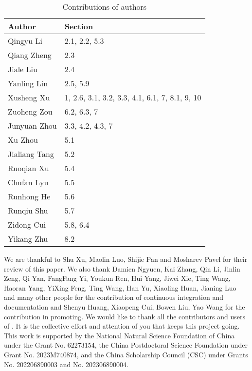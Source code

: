\documentclass[pra,twocolumn,superscriptaddress,floatfix,nofootinbib,amsmath,amssymb]{revtex4-1}
\numberwithin{equation}{section}
\numberwithin{figure}{section}
\numberwithin{table}{section}
\begin{document}
\begin{table}[ht]
    \begin{tabular}{|p{3cm}|p{3cm}|}
        \toprule
        Author        & Section                                        \\
        \midrule
        Qingyu Li     & 2.1, 2.2, 5.3                                  \\
        Qiang Zheng   & 2.3                                            \\
        Jiale Liu     & 2.4                                            \\
        Yanling Lin   & 2.5, 5.9                                       \\
        Xusheng Xu    & 1, 2.6, 3.1, 3.2, 3.3, 4.1, 6.1, 7, 8.1, 9, 10 \\
        Zuoheng Zou   & 6.2, 6.3, 7                                    \\
        Junyuan Zhou  & 3.3, 4.2, 4.3, 7                               \\
        Xu Zhou       & 5.1                                            \\
        Jialiang Tang & 5.2                                            \\
        Ruoqian Xu    & 5.4                                            \\
        Chufan Lyu    & 5.5                                            \\
        Runhong He    & 5.6                                            \\
        Runqiu Shu    & 5.7                                            \\
        Zidong Cui    & 5.8, 6.4                                       \\
        Yikang Zhu    & 8.2                                            \\
        \bottomrule
    \end{tabular}
    \caption{Contributions of authors}
    \label{tab:contributions}
\end{table}

We are thankful to Shu Xu, Maolin Luo, Shijie Pan and Mosharev Pavel for their review of this paper. We also thank Damien Ngyuen, Kai Zhang, Qin Li, Jinlin Zeng, Qi Yan, FangFang Yi, Youkun Ren, Hui Yang, Jiwei Xie, Ting Wang, Haoran Yang, YiXing Feng, Ting Wang, Han Yu, Xiaoling Huan, Jianing Luo and many other people for the contribution of continuous integration and documentation and Shenyu Huang, Xiaopeng Cui, Bowen Liu, Yao Wang for the contribution in promoting. We would like to thank all the contributors and users of \MindQuantum. It is the collective effort and attention of you that keeps this project going.
This work is supported by the National Natural Science Foundation of China under the Grant No. 62273154, the China Postdoctoral Science Foundation under Grant No. 2023M740874, and the China Scholarship Council (CSC) under Grants No. 202206890003 and No. 202306890004.

\end{document}
